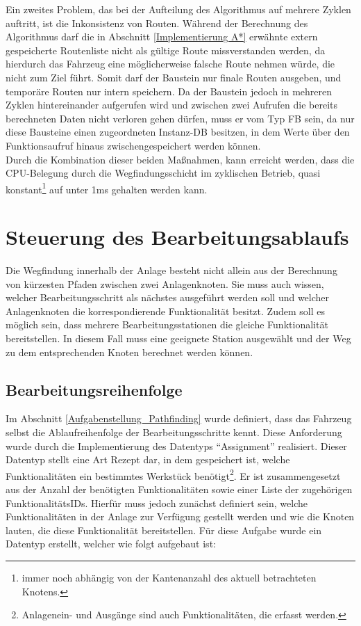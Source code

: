 			Ein zweites Problem, das bei der Aufteilung des Algorithmus auf mehrere Zyklen auftritt, ist die Inkonsistenz von Routen. Während der Berechnung des Algorithmus darf die in Abschnitt \ref{Implementierung A*} erwähnte extern gespeicherte Routenliste nicht als gültige Route missverstanden werden, da hierdurch das Fahrzeug eine möglicherweise falsche Route nehmen würde, die nicht zum Ziel führt. Somit darf der Baustein nur finale Routen ausgeben, und temporäre Routen nur intern speichern. Da der Baustein jedoch in mehreren Zyklen hintereinander aufgerufen wird und zwischen zwei Aufrufen die bereits berechneten Daten nicht verloren gehen dürfen, muss er vom Typ \ac{FB} sein, da nur diese Bausteine einen zugeordneten Instanz-\acl{DB} besitzen, in dem Werte über den Funktionsaufruf hinaus zwischengespeichert werden können.
			\\[4pt]
			Durch die Kombination dieser beiden Maßnahmen, kann erreicht werden, dass die CPU-Belegung durch die Wegfindungsschicht im zyklischen Betrieb, quasi konstant\footnote{immer noch abhängig von der Kantenanzahl des aktuell betrachteten Knotens.} auf unter 1ms gehalten werden kann.
		
	\section{Steuerung des Bearbeitungsablaufs}
		
		Die Wegfindung innerhalb der Anlage besteht nicht allein aus der Berechnung von kürzesten Pfaden zwischen zwei Anlagenknoten. Sie muss auch wissen, welcher Bearbeitungsschritt als nächstes ausgeführt werden soll und welcher Anlagenknoten die korrespondierende Funktionalität besitzt. Zudem soll es möglich sein, dass mehrere Bearbeitungsstationen die gleiche Funktionalität bereitstellen. In diesem Fall muss eine geeignete Station ausgewählt und der Weg zu dem entsprechenden Knoten berechnet werden können.
	
		\subsection{Bearbeitungsreihenfolge}
			\label{Bearbeitungsreihenfolge}
			Im Abschnitt \ref{Aufgabenstellung_Pathfinding} wurde definiert, dass das Fahrzeug selbst die Ablaufreihenfolge der Bearbeitungsschritte kennt. Diese Anforderung wurde durch die Implementierung des Datentyps "`Assignment"' realisiert. Dieser Datentyp stellt eine Art Rezept dar, in dem gespeichert ist, welche Funktionalitäten ein bestimmtes Werkstück benötigt\footnote{Anlagenein- und Ausgänge sind auch Funktionalitäten, die erfasst werden.}. Er ist zusammengesetzt aus der Anzahl der benötigten Funktionalitäten sowie einer Liste der zugehörigen FunktionalitätsIDs. Hierfür muss jedoch zunächst definiert sein, welche Funktionalitäten in der Anlage zur Verfügung gestellt werden und wie die Knoten lauten, die diese Funktionalität bereitstellen. Für diese Aufgabe wurde ein Datentyp erstellt, welcher wie folgt aufgebaut ist:
			

